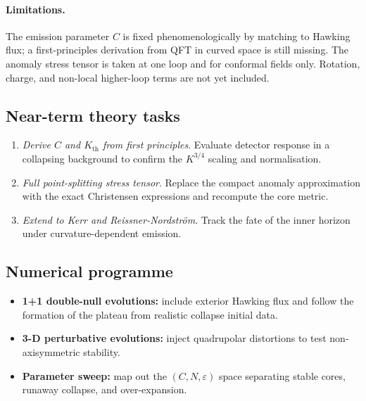 \paragraph{Limitations.}
The emission parameter \(C\) is fixed phenomenologically by matching to Hawking flux; a first-principles derivation from QFT in curved space is still missing. The anomaly stress tensor is taken at one loop and for conformal fields only. Rotation, charge, and non-local higher-loop terms are not yet included.

\subsection{Near-term theory tasks}

\begin{enumerate}[label=\textbf{T\arabic*},leftmargin=*]
  \item \emph{Derive \(C\) and \(K_{\mathrm{th}}\) from first principles}. Evaluate detector response in a collapsing background to confirm the \(K^{3/4}\) scaling and normalisation.
  \item \emph{Full point-splitting stress tensor}. Replace the compact anomaly approximation with the exact Christensen expressions and recompute the core metric.
  \item \emph{Extend to Kerr and Reissner-Nordström}. Track the fate of the inner horizon under curvature-dependent emission.
\end{enumerate}

\subsection{Numerical programme}

\begin{itemize}[leftmargin=*]
  \item \textbf{1+1 double-null evolutions:} include exterior Hawking flux and follow the formation of the plateau from realistic collapse initial data.
  \item \textbf{3-D perturbative evolutions:} inject quadrupolar distortions to test non-axisymmetric stability.
  \item \textbf{Parameter sweep:} map out the $(C,N,\varepsilon)$ space separating stable cores, runaway collapse, and over-expansion.
\end{itemize}

